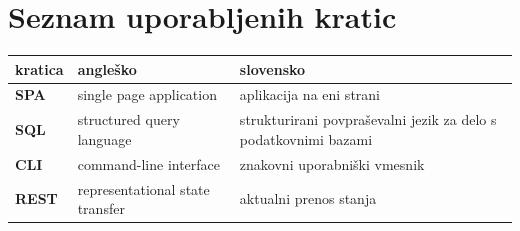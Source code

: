 \documentclass[a4paper, 12pt]{book}
\newcommand{\clearemptydoublepage}{\newpage{\pagestyle{empty}\cleardoublepage}}
\begin{document}
\clearemptydoublepage


\pagestyle{empty}
\def\thepage{}%
\tableofcontents{}

\clearemptydoublepage


\chapter*{Seznam uporabljenih kratic}  %

\noindent\begin{tabular}{p{}|p{}|p{}}    %
  {\bf kratica} & {\bf angleško}                             & {\bf slovensko} \\ \hline
  {\bf SPA}      & single page application               &  aplikacija na eni strani \\
  {\bf SQL} & structured query language & strukturirani povpraševalni jezik za delo s podatkovnimi bazami  \\
  {\bf CLI}   & command-line interface              & znakovni uporabniški vmesnik \\
  {\bf REST}   & representational state transfer              & aktualni prenos stanja \\
\end{tabular}
\end{document}
